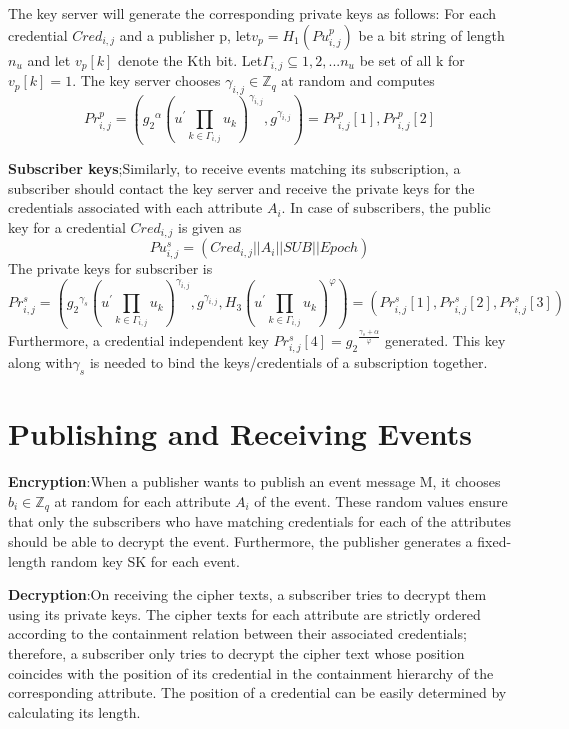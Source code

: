 \documentclass[MTech]{iitmdiss}
\begin{document}
The key server will generate the corresponding private keys
as follows: For each credential $Cred_{i,j}$ and a publisher p, let$v_p =H_1( Pu_{i,j}^p)$ be a bit string of length $n_u$ and let $v_p[k]$
denote the Kth bit. Let$\Gamma _{i,j} \subseteq{1,2,...n_u}$ be set of all k for $v_p[k]=1$. The key server chooses $\gamma_{i,j}\in \mathbb{Z}_q$ at
random and computes
\begin{equation}
\label{eq-quad}
Pr_{i,j}^p=({g_{2}}^\alpha(u^{'}\prod_{k\in \Gamma _{i,j}}                     u_k)^{\gamma_{i,j}},g^{\gamma_{i,j}})=Pr_{i,j}^p[1],Pr_{i,j}^p[2]
\end{equation}

\noindent
\textbf{Subscriber keys};Similarly, to receive events matching its
subscription, a subscriber should contact the key server and
receive the private keys for the credentials associated with
each attribute $A_i$. In case of subscribers, the public key for a
credential $Cred_{i,j}$ is given as 
\begin{equation}
\label{eq-quad}
Pu_{i,j}^s=(Cred_{i,j}||A_i||SUB||Epoch)
\end{equation}
The private keys for subscriber is
\begin{equation}
\label{eq-quad}
Pr_{i,j}^s=({g_{2}}^{\gamma_s}(u^{'}\prod_{k\in \Gamma _{i,j}} u_k)^{\gamma_{i,j}},g^{\gamma_{i,j}},H_3(u^{'}\prod_{k\in \Gamma _{i,j}} u_k)^{\varphi})=(Pr_{i,j}^s[1],Pr_{i,j}^s[2],Pr_{i,j}^s[3])
\end{equation}
Furthermore, a credential independent key  $Pr_{i,j}^s[4]={g_2}^{\frac{\gamma_s+\alpha}{\varphi}}$
generated. This key along with$ \gamma_s$ is
needed to bind the keys/credentials of a subscription
together.
\section{Publishing and Receiving  Events}
\textbf{Encryption}:When a publisher wants to publish an event
message M, it chooses $b_i \in \mathbb{Z}_q$ at random for each attribute
$A_i$ of the event. These random values ensure that only the subscribers who have matching
credentials for each of the attributes should be able to
decrypt the event. Furthermore, the publisher generates a
fixed-length random key SK for each event.

\noindent
\textbf{Decryption}:On receiving the cipher texts, a subscriber tries to
decrypt them using its private keys. The cipher texts for each
attribute are strictly ordered according to the containment
relation between their associated credentials; therefore, a
subscriber only tries to decrypt the cipher text whose
position coincides with the position of its
 credential in the containment hierarchy of the corresponding attribute. The
position of a credential can be easily determined by
calculating its length.
\pagebreak
\clearpage
\end{document}
